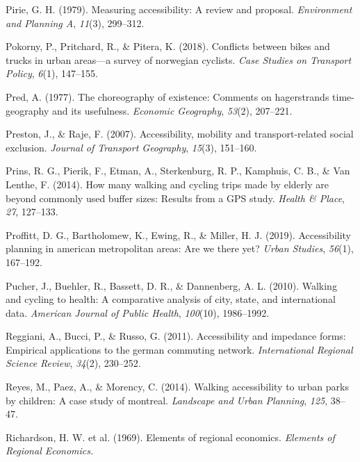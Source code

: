 \documentclass[
11pt, %
oneside, %
english, %
singlespacing, %
]{macthesis} %
\newlength{\cslhangindent}
\newenvironment{CSLReferences}[2] %
{\begin{list}{}{%
	\setlength{\itemindent}{0pt}
	\setlength{\leftmargin}{0pt}
	\setlength{\parsep}{0pt}
	\ifodd #1
	\setlength{\leftmargin}{\cslhangindent}
	\setlength{\itemindent}{-1\cslhangindent}
	\fi
	\setlength{\itemsep}{#2\baselineskip}}}
{\end{list}}
\begin{document}
\begin{CSLReferences}{1}{0}
Pirie, G. H. (1979). Measuring accessibility: A review and proposal. \emph{Environment and Planning A}, \emph{11}(3), 299--312.

Pokorny, P., Pritchard, R., \& Pitera, K. (2018). Conflicts between bikes and trucks in urban areas---a survey of norwegian cyclists. \emph{Case Studies on Transport Policy}, \emph{6}(1), 147--155.

Pred, A. (1977). The choreography of existence: Comments on hagerstrands time-geography and its usefulness. \emph{Economic Geography}, \emph{53}(2), 207--221.

Preston, J., \& Raje, F. (2007). Accessibility, mobility and transport-related social exclusion. \emph{Journal of Transport Geography}, \emph{15}(3), 151--160.

Prins, R. G., Pierik, F., Etman, A., Sterkenburg, R. P., Kamphuis, C. B., \& Van Lenthe, F. (2014). How many walking and cycling trips made by elderly are beyond commonly used buffer sizes: Results from a GPS study. \emph{Health \& Place}, \emph{27}, 127--133.

Proffitt, D. G., Bartholomew, K., Ewing, R., \& Miller, H. J. (2019). Accessibility planning in american metropolitan areas: Are we there yet? \emph{Urban Studies}, \emph{56}(1), 167--192.

Pucher, J., Buehler, R., Bassett, D. R., \& Dannenberg, A. L. (2010). Walking and cycling to health: A comparative analysis of city, state, and international data. \emph{American Journal of Public Health}, \emph{100}(10), 1986--1992.

Reggiani, A., Bucci, P., \& Russo, G. (2011). Accessibility and impedance forms: Empirical applications to the german commuting network. \emph{International Regional Science Review}, \emph{34}(2), 230--252.

Reyes, M., Paez, A., \& Morency, C. (2014). Walking accessibility to urban parks by children: A case study of montreal. \emph{Landscape and Urban Planning}, \emph{125}, 38--47.

Richardson, H. W. et al. (1969). Elements of regional economics. \emph{Elements of Regional Economics.}


\end{CSLReferences}
\end{document}
